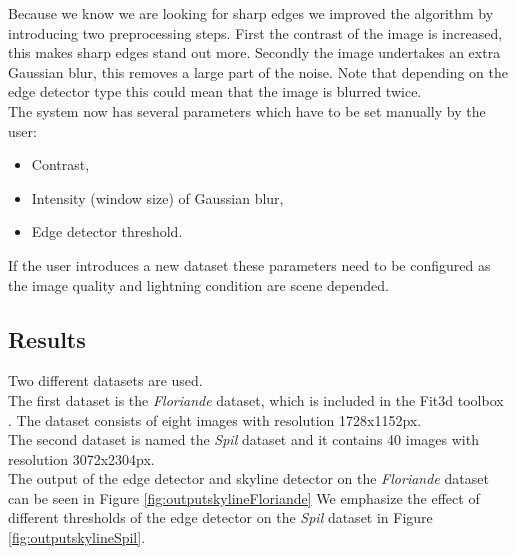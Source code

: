 Because we know we are looking for sharp edges we improved the algorithm by
introducing two preprocessing steps. First the contrast of the image is
increased, this makes sharp edges stand out more.  Secondly the image undertakes
an extra Gaussian blur, this removes a large part of the noise. Note that
depending on the edge detector type this could mean that the image is blurred
twice.\\


The system now has several parameters which have to be set manually by the user:
\begin{itemize}
	\item Contrast,
	\item Intensity (window size) of Gaussian blur,
	\item Edge detector threshold.
\end{itemize}

If the user introduces a new dataset these parameters need to be configured
as the image quality and lightning condition are scene depended.


\subsection{Results}%
Two different datasets are used. \\
The first dataset is the \emph{Floriande} dataset, which is included in the
Fit3d toolbox \cite{Fit3d}.  The dataset consists of eight images with resolution 1728x1152px.\\
The second dataset is named the \emph{Spil} dataset and it contains 40 images
with resolution 3072x2304px.\\

The output of the edge detector and skyline detector on the \emph{Floriande}
dataset \cite{Fit3d} can be seen in Figure \ref{fig:outputskylineFloriande}
We emphasize the effect of different thresholds of the edge detector on the
\emph{Spil} dataset in Figure \ref{fig:outputskylineSpil}.

